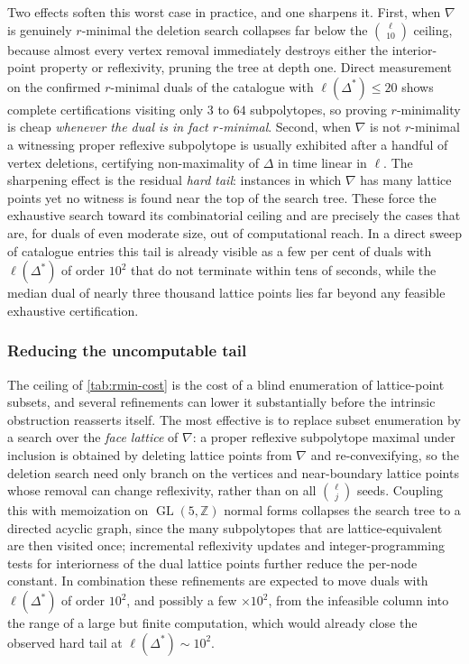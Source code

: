 \documentclass[appliedmath,article,submit,moreauthors]{Definitions/mdpi}
\newcommand{\Z}{\mathbb{Z}}
\newcommand{\GL}{\operatorname{GL}}
\begin{document}
Two effects soften this worst case in practice, and one sharpens it. First, when
\(\nabla\) is genuinely \(r\)-minimal the deletion search collapses far below
the \(\binom{\ell}{10}\) ceiling, because almost every vertex removal
immediately destroys either the interior-point property or reflexivity, pruning
the tree at depth one. Direct measurement on the confirmed \(r\)-minimal duals
of the catalogue with \(\ell(\Delta^*)\leq20\) shows complete certifications
visiting only \(3\) to \(64\) subpolytopes, so proving \(r\)-minimality is cheap
\emph{whenever the dual is in fact \(r\)-minimal}. Second, when \(\nabla\) is
not \(r\)-minimal a witnessing proper reflexive subpolytope is usually exhibited
after a handful of vertex deletions, certifying non-maximality of \(\Delta\) in
time linear in \(\ell\). The sharpening effect is the residual \emph{hard tail}:
instances in which \(\nabla\) has many lattice points yet no witness is found
near the top of the search tree. These force the exhaustive search toward its
combinatorial ceiling and are precisely the cases that are, for duals of even
moderate size, out of computational reach. In a direct sweep of catalogue
entries this tail is already visible as a few per cent of duals with
\(\ell(\Delta^*)\) of order \(10^{2}\) that do not terminate within tens of
seconds, while the median dual of nearly three thousand lattice points lies far
beyond any feasible exhaustive certification.

\subsubsection{Reducing the uncomputable tail}
\label{sec:rmax-algorithm}

The ceiling of \cref{tab:rmin-cost} is the cost of a blind enumeration of
lattice-point subsets, and several refinements can lower it substantially before
the intrinsic obstruction reasserts itself. The most effective is to replace
subset enumeration by a search over the \emph{face lattice} of \(\nabla\): a
proper reflexive subpolytope maximal under inclusion is obtained by deleting
lattice points from \(\nabla\) and re-convexifying, so the deletion search need
only branch on the vertices and near-boundary lattice points whose removal can
change reflexivity, rather than on all \(\binom{\ell}{j}\) seeds. Coupling this
with memoization on \(\GL(5,\Z)\) normal forms collapses the search tree to a
directed acyclic graph, since the many subpolytopes that are lattice-equivalent
are then visited once; incremental reflexivity updates and integer-programming
tests for interiorness of the dual lattice points further reduce the per-node
constant. In combination these refinements are expected to move duals with
\(\ell(\Delta^*)\) of order \(10^{2}\), and possibly a few \(\times10^{2}\),
from the infeasible column into the range of a large but finite computation,
which would already close the observed hard tail at
\(\ell(\Delta^*)\sim10^{2}\).
\end{document}
